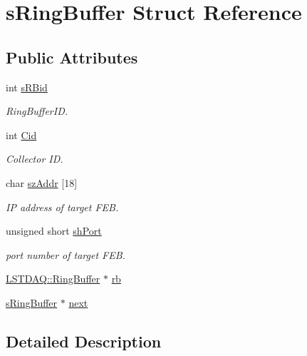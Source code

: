 \hypertarget{structsRingBuffer}{}\section{s\+Ring\+Buffer Struct Reference}
\label{structsRingBuffer}
\subsection*{Public Attributes}
\begin{DoxyCompactItemize}
\item 
int \hyperlink{structsRingBuffer_a86973832a168fb3fb15847da4407e590}{s\+R\+Bid}
\begin{DoxyCompactList}\small\item\em Ring\+Buffer\+ID. \end{DoxyCompactList}\item 
int \hyperlink{structsRingBuffer_ac518da2b168acdf6876786ad38465d3d}{Cid}
\begin{DoxyCompactList}\small\item\em Collector ID. \end{DoxyCompactList}\item 
char \hyperlink{structsRingBuffer_a3d8b0121e3a6f4c1657581c5446e67cc}{sz\+Addr} \mbox{[}18\mbox{]}
\begin{DoxyCompactList}\small\item\em IP address of target F\+EB. \end{DoxyCompactList}\item 
unsigned short \hyperlink{structsRingBuffer_a38ec2d7373bbb5e89f7282c3de49e564}{sh\+Port}
\begin{DoxyCompactList}\small\item\em port number of target F\+EB. \end{DoxyCompactList}\item 
\hyperlink{classLSTDAQ_1_1RingBuffer}{L\+S\+T\+D\+A\+Q\+::\+Ring\+Buffer} $\ast$ \hyperlink{structsRingBuffer_a02e62b51275c98f3e74e6b04d9f3ecb6}{rb}
\item 
\hyperlink{structsRingBuffer}{s\+Ring\+Buffer} $\ast$ \hyperlink{structsRingBuffer_a3685b679b0732b84bbccb1f467638ea9}{next}
\end{DoxyCompactItemize}


\subsection{Detailed Description}

